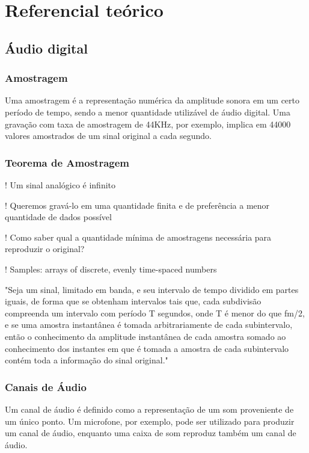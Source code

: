\chapter{Referencial teórico}\label{cap:referencialTeorico}

\section{Áudio digital}

\subsection{Amostragem}
Uma amostragem é a representação numérica da amplitude sonora em um certo período de tempo, sendo a menor quantidade utilizável de áudio digital. Uma gravação com taxa de amostragem de 44KHz, por exemplo, implica em 44000 valores amostrados de um sinal original a cada segundo.

\subsection{Teorema de Amostragem}
! Um sinal analógico é infinito

! Queremos gravá-lo em uma quantidade finita e de preferência a menor quantidade de dados possível

! Como saber qual a quantidade mínima de amostragens necessária para reproduzir o original?

! Samples: arrays of discrete, evenly time-spaced numbers

\begin{displayquote}
"Seja um sinal, limitado em banda, e seu intervalo de tempo dividido em partes iguais, de forma que se obtenham intervalos tais que, cada subdivisão compreenda um intervalo com período T segundos, onde T é menor do que fm/2, e se uma amostra instantânea é tomada arbitrariamente de cada subintervalo, então o conhecimento da amplitude instantânea de cada amostra somado ao conhecimento dos instantes em que é tomada a amostra de cada subintervalo contém toda a informação do sinal original."
\end{displayquote}

\subsection{Canais de Áudio}
Um canal de áudio é definido como a representação de um som proveniente de um único ponto. Um microfone, por exemplo, pode ser utilizado para produzir um canal de áudio, enquanto uma caixa de som reproduz também um canal de áudio.

